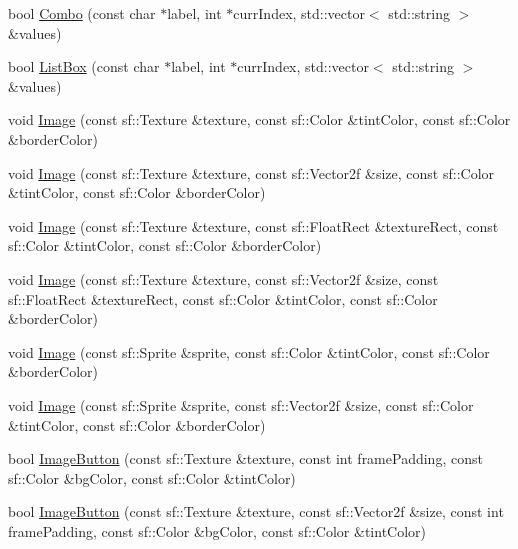 \begin{DoxyCompactItemize}
\item 
bool \mbox{\hyperlink{namespace_im_gui_a405b19deb7db39d92f42ac1329740892}{Combo}} (const char $\ast$label, int $\ast$curr\+Index, std\+::vector$<$ std\+::string $>$ \&values)
\item 
bool \mbox{\hyperlink{namespace_im_gui_ac04be3d604f4b471625fb9823a6bb70b}{List\+Box}} (const char $\ast$label, int $\ast$curr\+Index, std\+::vector$<$ std\+::string $>$ \&values)
\item 
void \mbox{\hyperlink{namespace_im_gui_a6edd99e13610a7aa37d6befa622a33d5}{Image}} (const sf\+::\+Texture \&texture, const sf\+::\+Color \&tint\+Color, const sf\+::\+Color \&border\+Color)
\item 
void \mbox{\hyperlink{namespace_im_gui_ad6ab801840d7c487d66946ceca63632f}{Image}} (const sf\+::\+Texture \&texture, const sf\+::\+Vector2f \&size, const sf\+::\+Color \&tint\+Color, const sf\+::\+Color \&border\+Color)
\item 
void \mbox{\hyperlink{namespace_im_gui_a38a669345d55f897af0964def4acdc07}{Image}} (const sf\+::\+Texture \&texture, const sf\+::\+Float\+Rect \&texture\+Rect, const sf\+::\+Color \&tint\+Color, const sf\+::\+Color \&border\+Color)
\item 
void \mbox{\hyperlink{namespace_im_gui_a5a7a802b1e04f9fb07d7224b685f604e}{Image}} (const sf\+::\+Texture \&texture, const sf\+::\+Vector2f \&size, const sf\+::\+Float\+Rect \&texture\+Rect, const sf\+::\+Color \&tint\+Color, const sf\+::\+Color \&border\+Color)
\item 
void \mbox{\hyperlink{namespace_im_gui_a12ec1591629f9e4d845ca63501e3d577}{Image}} (const sf\+::\+Sprite \&sprite, const sf\+::\+Color \&tint\+Color, const sf\+::\+Color \&border\+Color)
\item 
void \mbox{\hyperlink{namespace_im_gui_ad852f4318abae0ec25a66620811eeb3a}{Image}} (const sf\+::\+Sprite \&sprite, const sf\+::\+Vector2f \&size, const sf\+::\+Color \&tint\+Color, const sf\+::\+Color \&border\+Color)
\item 
bool \mbox{\hyperlink{namespace_im_gui_ab30a68eecc7388f7708e87968445c414}{Image\+Button}} (const sf\+::\+Texture \&texture, const int frame\+Padding, const sf\+::\+Color \&bg\+Color, const sf\+::\+Color \&tint\+Color)
\item 
bool \mbox{\hyperlink{namespace_im_gui_a54dd41917603ec28ae8aa42625aecda0}{Image\+Button}} (const sf\+::\+Texture \&texture, const sf\+::\+Vector2f \&size, const int frame\+Padding, const sf\+::\+Color \&bg\+Color, const sf\+::\+Color \&tint\+Color)

\end{DoxyCompactItemize}
